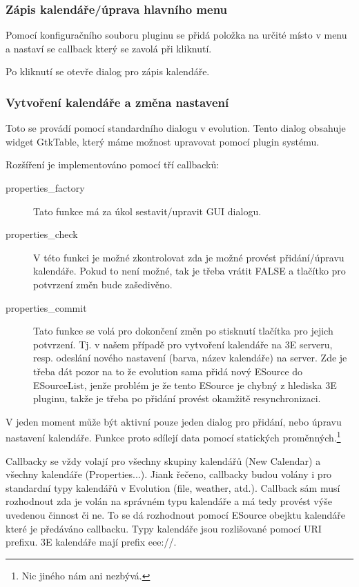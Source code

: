 \documentclass[a4paper,10pt]{article}
\begin{document}
\begin{multicols*}{2}
\subsubsection{Zápis kalendáře/úprava hlavního menu}

Pomocí konfiguračního souboru pluginu se přidá položka na určité místo v menu a
nastaví se callback který se zavolá při kliknutí.

Po kliknutí se otevře dialog pro zápis kalendáře.

\subsubsection{Vytvoření kalendáře a změna nastavení}

Toto se provádí pomocí standardního dialogu v evolution. Tento dialog obsahuje
widget GtkTable, který máme možnost upravovat pomocí plugin systému.

Rozšíření je implementováno pomocí tří callbacků:
\begin{description}
\item [properties\_factory] Tato funkce má za úkol sestavit/upravit GUI dialogu.
\item [properties\_check] V této funkci je možné zkontrolovat zda je možné
provést přidání/úpravu kalendáře. Pokud to není možné, tak je třeba vrátit FALSE
a tlačítko pro potvrzení změn bude zašedivěno.
\item [properties\_commit] Tato funkce se volá pro dokončení změn po stisknutí
tlačítka pro jejich potvrzení. Tj. v našem případě pro vytvoření kalendáře na 3E
serveru, resp. odeslání nového nastavení (barva, název kalendáře) na server.
Zde je třeba dát pozor na to že evolution sama přidá nový ESource do
ESourceList, jenže problém je že tento ESource je chybný z hlediska 3E
pluginu, takže je třeba po přidání provést okamžitě resynchronizaci.
\end{description}

V jeden moment může být aktivní pouze jeden dialog pro přidání, nebo úpravu nastavení
kalendáře. Funkce proto sdílejí data pomocí statických proměnných.\footnote{Nic
jiného nám ani nezbývá.}

Callbacky se vždy volají pro všechny skupiny kalendářů (New Calendar) a všechny
kalendáře (Properties...). Jiank řečeno, callbacky budou volány i pro standardní
typy kalendářů v Evolution (file, weather, atd.). Callback sám musí rozhodnout
zda je volán na správném typu kalendáře a má tedy provést výše uvedenou činnost
či ne. To se dá rozhodnout pomocí ESource obejktu kalendáře které je předáváno
callbacku. Typy kalendáře jsou rozlišované pomocí URI prefixu. 3E kalendáře mají
prefix eee://.


\end{multicols*}
\end{document}
